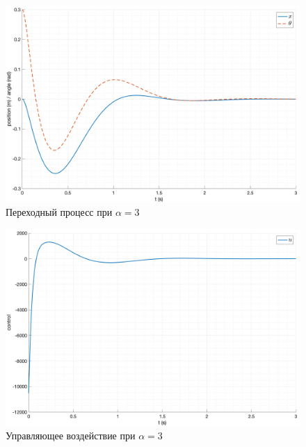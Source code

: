 \begin{figure}[ht!]
    \centering
    \includegraphics[width=\textwidth]{media/plots/nonmodal_controllers/out_2.png}
    \caption{Переходный процесс при $\alpha = 3$}
    \label{fig:nonmodal_control_alpha_2}
\end{figure}
\begin{figure}[ht!]
    \centering
    \includegraphics[width=\textwidth]{media/plots/nonmodal_controllers/u_2.png}
    \caption{Управляющее воздействие при $\alpha = 3$}
    \label{fig:nonmodal_control_alpha_2_u}
\end{figure}
